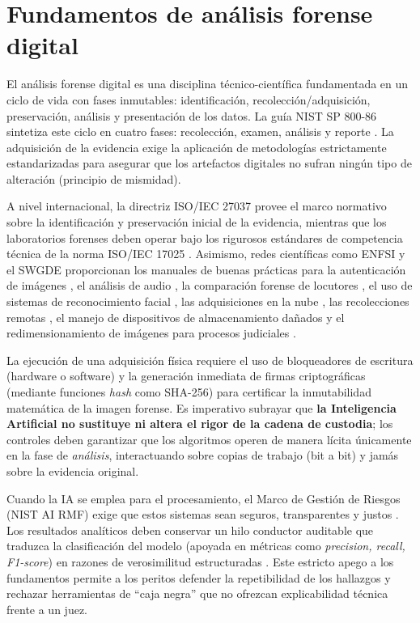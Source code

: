 \documentclass[journal]{IEEEtran}
\begin{document}
\section{Fundamentos de análisis forense digital}
El análisis forense digital es una disciplina técnico-científica fundamentada en un ciclo de vida con fases inmutables: identificación, recolección/adquisición, preservación, análisis y presentación de los datos. La guía NIST SP 800-86 sintetiza este ciclo en cuatro fases: recolección, examen, análisis y reporte \cite{NIST_SP_800_86}. La adquisición de la evidencia exige la aplicación de metodologías estrictamente estandarizadas para asegurar que los artefactos digitales no sufran ningún tipo de alteración (principio de mismidad).

A nivel internacional, la directriz ISO/IEC 27037 \cite{ISO_27037} provee el marco normativo sobre la identificación y preservación inicial de la evidencia, mientras que los laboratorios forenses deben operar bajo los rigurosos estándares de competencia técnica de la norma ISO/IEC 17025 \cite{ISO_17025}. Asimismo, redes científicas como ENFSI y el SWGDE proporcionan los manuales de buenas prácticas para la autenticación de imágenes \cite{ENFSI_BPM_Image_2021}, el análisis de audio \cite{ENFSI_BPM_Audio_2022}, la comparación forense de locutores \cite{ENFSI_BPM_Speaker_2022}, el uso de sistemas de reconocimiento facial \cite{ENFSI_GDL_Facial_2022}, las adquisiciones en la nube \cite{SWGDE_Cloud_2025}, las recolecciones remotas \cite{SWGDE_Remote_2025}, el manejo de dispositivos de almacenamiento dañados \cite{SWGDE_Damaged_2025} y el redimensionamiento de imágenes para procesos judiciales \cite{SWGDE_Resizing_2025}.

La ejecución de una adquisición física requiere el uso de bloqueadores de escritura (hardware o software) y la generación inmediata de firmas criptográficas (mediante funciones \textit{hash} como SHA-256) para certificar la inmutabilidad matemática de la imagen forense. Es imperativo subrayar que \textbf{la Inteligencia Artificial no sustituye ni altera el rigor de la cadena de custodia}; los controles deben garantizar que los algoritmos operen de manera lícita únicamente en la fase de \textit{análisis}, interactuando sobre copias de trabajo (bit a bit) y jamás sobre la evidencia original.

Cuando la IA se emplea para el procesamiento, el Marco de Gestión de Riesgos (NIST AI RMF) exige que estos sistemas sean seguros, transparentes y justos \cite{NIST_AI_RMF_2023}. Los resultados analíticos deben conservar un hilo conductor auditable que traduzca la clasificación del modelo (apoyada en métricas como \textit{precision, recall, F1-score}) en razones de verosimilitud estructuradas \cite{WarrenEricM.2025Ceal}. Este estricto apego a los fundamentos permite a los peritos defender la repetibilidad de los hallazgos y rechazar herramientas de ``caja negra'' que no ofrezcan explicabilidad técnica frente a un juez.
\end{document}
